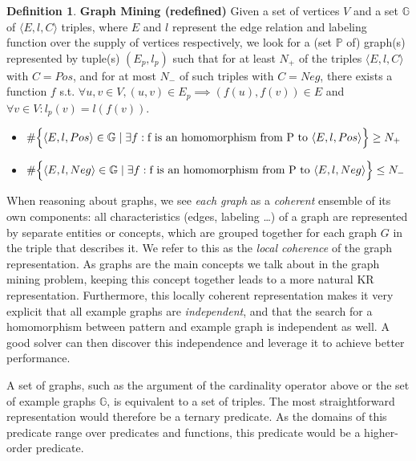 \documentclass{article}
\theoremstyle{definition}
\newtheorem{definition}{Definition}[section]
\newcommand{\triple}[1]{\ensuremath{\langle #1 \rangle}}
\newcommand{\pair}[1]{\ensuremath{\left(#1\right)}}
\newcommand{\graphset}[1]{\ensuremath{\mathbb{#1}}}
\begin{document}
\begin{definition} \textbf{Graph Mining (redefined)}
\label{def:gm2}
Given a set of vertices $V$ and a set $\graphset{G}$ of $\triple{E, l, C}$ triples,
where $E$ and $l$ represent the edge relation and labeling function over the supply of vertices respectively,
we look for a (set $\graphset{P}$ of)  graph(s) represented by tuple(s) $\pair{E_{p}, l_{p}}$ such that
for at least $N_{+}$ of the triples $\triple{ E, l, C}$ with $C=Pos$, and for at most $N_{-}$ of such triples with $C=Neg$, there exists a function $f$ s.t. $\forall u,v \in V, \pair{u,v} \in E_{p} \implies \pair{f(u),f(v)} \in E$ and $\forall v \in V : l_{p}(v) = l(f(v))$.

\begin{itemize}
\item $\#\Big\lbrace \triple{E,l,Pos} \in \graphset{G} \; | \; \exists f : \text{f is an homomorphism from P to \triple{E,l,Pos}} \Big\rbrace \geq N_{+}$

\item $\#\Big\lbrace \triple{E,l,Neg} \in \graphset{G} \; | \; \exists f : \text{f is an homomorphism from P to \triple{E,l,Neg}} \Big\rbrace \leq N_{-}$
\end{itemize}
\end{definition}

When reasoning about graphs, we see \emph{each graph} as a \emph{coherent} ensemble of its own components: 
all characteristics (edges, labeling \ldots) of a graph are represented by separate entities or concepts, which are grouped together for each graph $G$ in the triple that describes it.
We refer to this as the \emph{local coherence} of the graph representation.
As graphs are the main concepts we talk about in the graph mining problem, keeping this concept together leads to a more natural KR representation.
Furthermore, this locally coherent representation makes it very explicit that all example graphs are \emph{independent}, and that the search for a homomorphism between pattern and example graph is independent as well.
A good solver can then discover this independence and leverage it to achieve better performance.

A set of graphs, such as the argument of the cardinality operator above or the set of example graphs $\graphset{G}$, is equivalent to a set of triples.
The most straightforward representation would therefore be a ternary predicate.
As the domains of this predicate range over predicates and functions, this predicate would be a higher-order predicate.
\end{document}
